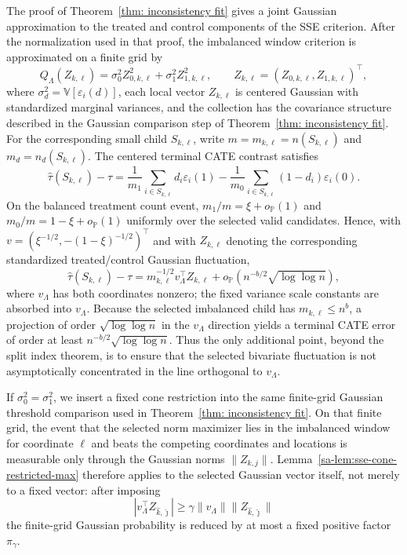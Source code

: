 \documentclass[10pt]{article}
\def\P{\mathbb{P}}
\def\V{\mathbb{V}}
\theoremstyle{definition}
\theoremstyle{remark}
\begin{document}
The proof of Theorem~\ref{thm: inconsistency fit} gives a joint Gaussian approximation to the treated and control components of the SSE criterion. After the normalization used in that proof, the imbalanced window criterion is approximated on a finite grid by
\[
    Q_\Lambda(Z_{k,\ell})
    =
    \sigma_0^2 Z_{0,k,\ell}^2
    +
    \sigma_1^2 Z_{1,k,\ell}^2,
    \qquad
    Z_{k,\ell}=(Z_{0,k,\ell},Z_{1,k,\ell})^\top,
\]
where $\sigma_d^2=\V[\varepsilon_i(d)]$, each local vector $Z_{k,\ell}$ is centered Gaussian with standardized marginal variances, and the collection has the covariance structure described in the Gaussian comparison step of Theorem~\ref{thm: inconsistency fit}. For the corresponding small child $S_{k,\ell}$, write $m=m_{k,\ell}=n(S_{k,\ell})$ and $m_d=n_d(S_{k,\ell})$. The centered terminal CATE contrast satisfies
\[
    \hat\tau(S_{k,\ell})-\tau
    =
    \frac{1}{m_1}\sum_{i\in S_{k,\ell}}d_i\varepsilon_i(1)
    -
    \frac{1}{m_0}\sum_{i\in S_{k,\ell}}(1-d_i)\varepsilon_i(0).
\]
On the balanced treatment count event, $m_1/m=\xi+o_\P(1)$ and $m_0/m=1-\xi+o_\P(1)$ uniformly over the selected valid candidates. Hence, with $v=(\xi^{-1/2},-(1-\xi)^{-1/2})^\top$ and with $Z_{k,\ell}$ denoting the corresponding standardized treated/control Gaussian fluctuation,
\[
    \hat\tau(S_{k,\ell})-\tau
    =
    m_{k,\ell}^{-1/2}v_\Lambda^\top Z_{k,\ell}
    +
    o_\P\!\left(n^{-b/2}\sqrt{\log\log n}\right),
\]
where $v_\Lambda$ has both coordinates nonzero; the fixed variance scale constants are absorbed into $v_\Lambda$. Because the selected imbalanced child has $m_{k,\ell}\leq n^b$, a projection of order $\sqrt{\log\log n}$ in the $v_\Lambda$ direction yields a terminal CATE error of order at least $n^{-b/2}\sqrt{\log\log n}$. Thus the only additional point, beyond the split index theorem, is to ensure that the selected bivariate fluctuation is not asymptotically concentrated in the line orthogonal to $v_\Lambda$.

If $\sigma_0^2=\sigma_1^2$, we insert a fixed cone restriction into the same finite-grid Gaussian threshold comparison used in Theorem~\ref{thm: inconsistency fit}. On that finite grid, the event that the selected norm maximizer lies in the imbalanced window for coordinate $\ell$ and beats the competing coordinates and locations is measurable only through the Gaussian norms $\|Z_{k,j}\|$. Lemma~\ref{sa-lem:sse-cone-restricted-max} therefore applies to the selected Gaussian vector itself, not merely to a fixed vector: after imposing
\[
    |v_\Lambda^\top Z_{\hat k,\hat{\jmath}}|
    \geq
    \gamma\|v_\Lambda\|\|Z_{\hat k,\hat{\jmath}}\|
\]
the finite-grid Gaussian probability is reduced by at most a fixed positive factor $\pi_\gamma$.
\end{document}
